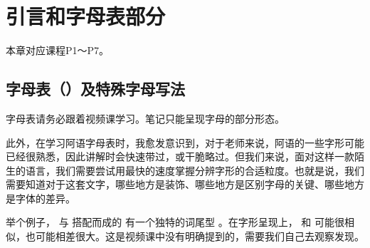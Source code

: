 \chapter{引言和字母表部分}

本章对应课程P1～P7。

\section{字母表（）及特殊字母写法}

\begin{note}
    字母表请务必跟着视频课学习。笔记只能呈现字母的部分形态。

    此外，在学习阿语字母表时，我愈发意识到，对于老师来说，阿语的一些字形可能已经很熟悉，因此讲解时会快速带过，或干脆略过。但我们来说，面对这样一款陌生的语言，我们需要尝试用最快的速度掌握分辨字形的合适粒度。也就是说，我们需要知道对于这套文字，哪些地方是装饰、哪些地方是区别字母的关键、哪些地方是字体的差异。

    举个例子， 与  搭配而成的  有一个独特的词尾型 。在字形呈现上，  和  可能很相似，也可能相差很大。这是视频课中没有明确提到的，需要我们自己去观察发现。
\end{note}

